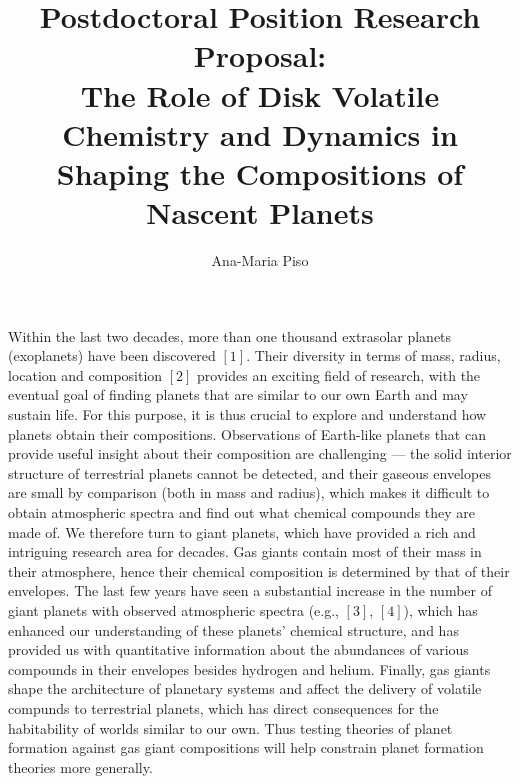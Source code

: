 \documentclass[12pt, letterpaper]{article}
\date{}
\title{\Large Postdoctoral Position Research Proposal: \\
The Role of Disk Volatile Chemistry and Dynamics in Shaping the Compositions of Nascent Planets\vspace{-2ex}}
\author{Ana-Maria Piso \vspace{-2ex}}
\begin{document}
\maketitle


\vspace{-1.5cm}


Within the last two decades, more than one thousand extrasolar planets (exoplanets) have been discovered $[1]$. Their diversity in terms of mass, radius, location and composition $[2]$ provides an exciting field of research, with the eventual goal of finding planets that are similar to our own Earth and may sustain life. For this purpose, it is thus crucial to explore and understand how planets obtain their compositions. Observations of Earth-like planets that can provide useful insight about their composition are challenging --- the solid interior structure of terrestrial planets cannot be detected, and their gaseous envelopes are small by comparison (both in mass and radius), which makes it difficult to obtain atmospheric spectra and find out what chemical compounds they are made of. We therefore turn to giant planets, which have provided a rich and intriguing research area for decades. Gas giants contain most of their mass in their atmosphere, hence their chemical composition is determined by that of their envelopes. The last few years have seen a substantial increase in the number of giant planets with observed atmospheric spectra (e.g., $[3]$, $[4]$), which has enhanced our understanding of these planets' chemical structure, and has provided us with quantitative information about the abundances of various compounds in their envelopes besides hydrogen and helium. Finally, gas giants shape the architecture of planetary systems and affect the delivery of volatile compunds to terrestrial planets, which has direct consequences for the habitability of worlds similar to our own. Thus testing theories of planet formation against gas giant compositions will help constrain planet formation theories more generally.     
\end{document}
